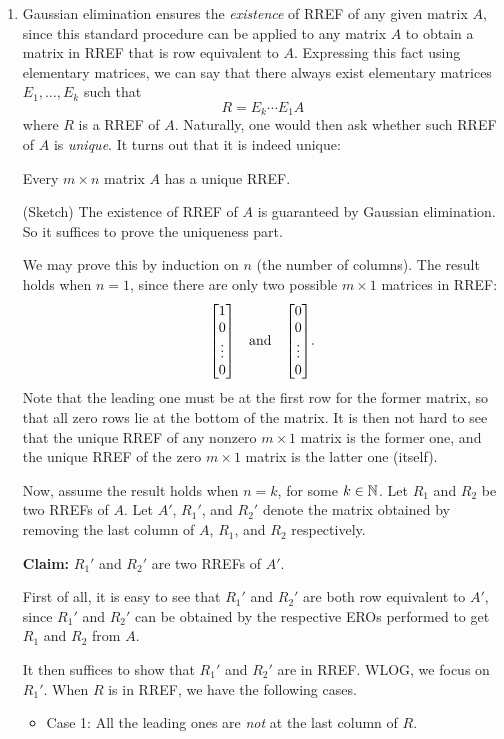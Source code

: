 \begin{enumerate}
\item Gaussian elimination ensures the \emph{existence} of RREF of any given
matrix \(A\), since this standard procedure can be applied to any matrix \(A\)
to obtain a matrix in RREF that is row equivalent to \(A\). Expressing this
fact using elementary matrices, we can say that there always exist elementary
matrices \(E_1,\dotsc,E_k\) such that
\[
R=E_k\dotsb E_1A
\]
where \(R\) is a RREF of \(A\). Naturally, one would then ask whether such RREF
of \(A\) is \emph{unique}. It turns out that it is indeed unique:

\begin{theorem}
\label{thm:rref-unique}
Every \(m\times n\) matrix \(A\) has a unique RREF.
\end{theorem}
\begin{pf}
(Sketch) The existence of RREF of \(A\) is guaranteed by Gaussian elimination.
So it suffices to prove the uniqueness part.

We may prove this by induction on \(n\) (the number of columns). The
result holds when \(n=1\), since there are only two possible \(m\times 1\)
matrices in RREF:
\[
\mqty[1\\ 0\\\vdots\\ 0]\qqtext{and}\mqty[0\\ 0\\\vdots\\ 0].
\]
Note that the leading one must be at the first row for the former matrix, so
that all zero rows lie at the bottom of the matrix. It is then not hard to see
that the unique RREF of any nonzero \(m\times 1\) matrix is the former one, and
the unique RREF of the zero \(m\times 1\) matrix is the latter one (itself).

Now, assume the result holds when \(n=k\), for some \(k\in\mathbb{N}\). Let \(R_1\) and
\(R_2\) be two RREFs of \(A\). Let \(A'\), \(R_1'\), and \(R_2'\) denote the
matrix obtained by removing the last column of \(A\), \(R_1\), and \(R_2\)
respectively.

\textbf{Claim:} \(R_1'\) and \(R_2'\) are two RREFs of \(A'\).

\begin{pf}
First of all, it is easy to see that \(R_1'\) and \(R_2'\) are both row equivalent
to \(A'\), since \(R_1'\) and \(R_2'\) can be obtained by the respective EROs
performed to get \(R_1\) and \(R_2\) from \(A\).

It then suffices to show that \(R_1'\) and \(R_2'\) are in RREF. WLOG, we focus
on \(R_1'\). When \(R\) is in RREF, we have the following cases.
\begin{itemize}
\item Case 1: All the leading ones are \emph{not} at the last column of \(R\).


\end{itemize}
\end{pf}
\end{pf}
\end{enumerate}
